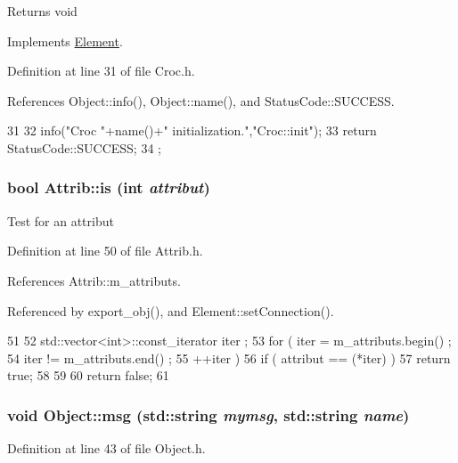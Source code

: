 \begin{DoxyReturn}{Returns}
void 
\end{DoxyReturn}


Implements \hyperlink{classElement_af42754b5cabc198869222725218d695c}{Element}.

Definition at line 31 of file Croc.h.

References Object::info(), Object::name(), and StatusCode::SUCCESS.


\begin{DoxyCode}
31                     {
32     info("Croc "+name()+" initialization.","Croc::init");
33     return StatusCode::SUCCESS;
34   };
\end{DoxyCode}
\hypertarget{classAttrib_a704f26af560909ad22065083bb7d4c34}{
\subsubsection[{is}]{\setlength{\rightskip}{0pt plus 5cm}bool Attrib::is (int {\em attribut})}}
\label{classAttrib_a704f26af560909ad22065083bb7d4c34}
Test for an attribut 

Definition at line 50 of file Attrib.h.

References Attrib::m\_\-attributs.

Referenced by export\_\-obj(), and Element::setConnection().


\begin{DoxyCode}
51   {
52     std::vector<int>::const_iterator iter ;
53     for ( iter  = m_attributs.begin() ;
54           iter != m_attributs.end()   ;
55           ++iter ) {
56       if ( attribut == (*iter) ) {
57         return true;
58       }
59     }
60     return false;
61   }
\end{DoxyCode}
\hypertarget{classObject_ac5d59299273cee27aacf7de00d2e7034}{
\subsubsection[{msg}]{\setlength{\rightskip}{0pt plus 5cm}void Object::msg (std::string {\em mymsg}, \/  std::string {\em name})}}
\label{classObject_ac5d59299273cee27aacf7de00d2e7034}


Definition at line 43 of file Object.h.

